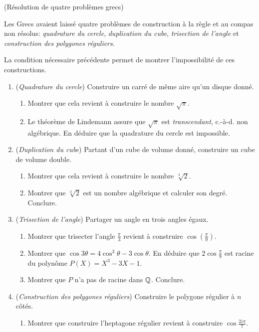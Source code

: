 \documentclass[a4paper,11pt,reqno]{amsart}
\begin{document}
\begin{exo}  (Résolution de quatre problèmes grecs)

  Les Grecs avaient laissé quatre problèmes de construction à la règle et au compas non résolus: \emph{quadrature du cercle}, \emph{duplication du cube}, \emph{trisection de l'angle} et \emph{construction des polygones réguliers}.

  La condition nécessaire précédente permet de montrer l'impossibilité de ces constructions.
  \begin{enumerate}
    \item (\emph{Quadrature du cercle}) Construire un carré de même aire qu'un disque donné.
    \begin{enumerate}
      \item Montrer que cela revient à construire le nombre $\sqrt{\pi}$.
      \item Le théorème de Lindemann assure que $\sqrt{\pi}$ est \emph{transcendant}, c.-à-d. non algébrique. En déduire que la quadrature du cercle est impossible.
    \end{enumerate}
    \item (\emph{Duplication du cube}) Partant d'un cube de volume donné, construire un cube de volume double.
    \begin{enumerate}
      \item Montrer que cela revient à construire le nombre $\sqrt[3]{2}$.
      \item Montrer que $\sqrt[3]{2}$ est un nombre algébrique et calculer son degré. Conclure.
    \end{enumerate}
    \item (\emph{Trisection de l'angle})  Partager un angle en trois angles égaux.
    \begin{enumerate}
      \item Montrer que trisecter l'angle $\frac{\pi}{3}$ revient à construire $\cos(\frac{\pi}{9})$.
      \item Montrer que $\cos 3\theta = 4 \cos^3 \theta -3 \cos \theta$. En déduire que $2 \cos \frac{\pi}{9}$ est racine du polynôme $P(X)=X^3-3X-1$.
      \item Montrer que $P$ n'a pas de racine dans $\mathbb{Q}$. Conclure.
    \end{enumerate}
    \item (\emph{Construction des polygones réguliers}) Construire le polygone régulier à $n$ côtés.
    \begin{enumerate}
      \item Montrer que construire l'heptagone régulier revient à construire $\cos\frac{2i\pi}{7}$.

\end{enumerate}
\end{enumerate}
\end{exo}
\end{document}

